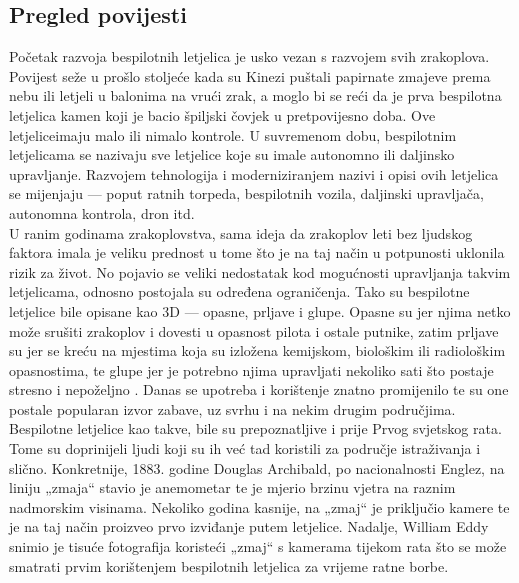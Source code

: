 \documentclass[times, utf8, diplomski]{fer}
\begin{document}
\subsection{Pregled povijesti}
Početak razvoja bespilotnih letjelica je usko vezan s razvojem svih zrakoplova. Povijest seže u prošlo stoljeće kada su Kinezi puštali papirnate zmajeve prema nebu ili letjeli u balonima na vrući zrak, a moglo bi se reći da je prva bespilotna letjelica kamen koji je bacio špiljski čovjek u pretpovijesno doba. Ove \glqq letjelice\grqq imaju malo ili nimalo kontrole. U suvremenom dobu, bespilotnim letjelicama se nazivaju sve letjelice koje su imale autonomno ili daljinsko upravljanje. Razvojem tehnologija i moderniziranjem nazivi i opisi ovih letjelica se mijenjaju --- poput ratnih torpeda, bespilotnih vozila, daljinski upravljača, autonomna kontrola, dron itd.\\
U ranim godinama zrakoplovstva, sama ideja da zrakoplov leti bez ljudskog faktora imala je veliku prednost u tome što je na taj način u potpunosti uklonila rizik za život. No pojavio se veliki nedostatak kod mogućnosti upravljanja takvim letjelicama, odnosno postojala su određena ograničenja. Tako su bespilotne letjelice bile opisane kao 3D  --- opasne, prljave i glupe. Opasne su jer njima netko može srušiti zrakoplov i dovesti u opasnost pilota i ostale putnike, zatim prljave su jer se kreću na mjestima koja su izložena kemijskom, biološkim ili radiološkim opasnostima, te glupe jer je potrebno njima upravljati nekoliko sati što postaje stresno i nepoželjno \citep{unmannedAircraftSystem}. Danas se upotreba i korištenje znatno promijenilo te su one postale popularan izvor zabave, uz svrhu i na nekim drugim područjima.\\
Bespilotne letjelice kao takve, bile su prepoznatljive i prije Prvog svjetskog rata. Tome su  doprinijeli ljudi koji su ih već tad koristili za područje istraživanja i slično. Konkretnije, 1883.  godine  Douglas  Archibald, po  nacionalnosti Englez,  na liniju  „zmaja“  stavio  je anemometar  te  je  mjerio  brzinu  vjetra  na  raznim  nadmorskim  visinama. Nekoliko  godina kasnije, na „zmaj“ je priključio kamere te je na taj način proizveo prvo izviđanje putem letjelice. Nadalje, William Eddy snimio je tisuće fotografija koristeći „zmaj“ s kamerama tijekom rata što se može smatrati prvim korištenjem bespilotnih letjelica za vrijeme ratne borbe\citep{UAVSystems}.\\
\end{document}
